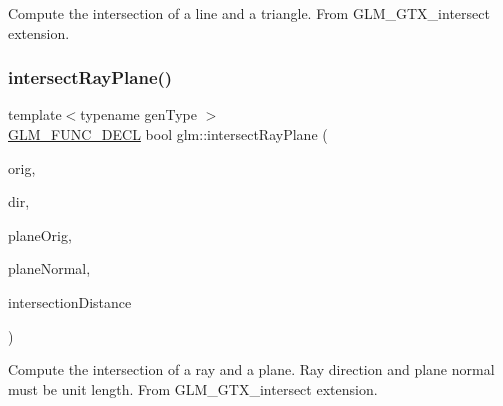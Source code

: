 Compute the intersection of a line and a triangle. From G\+L\+M\+\_\+\+G\+T\+X\+\_\+intersect extension. \mbox{\label{group__gtx__intersect_gad3697a9700ea379739a667ea02573488}} 
\subsubsection{\texorpdfstring{intersect\+Ray\+Plane()}{intersectRayPlane()}}
{\footnotesize\ttfamily template$<$typename gen\+Type $>$ \\
\mbox{\hyperlink{setup_8hpp_ab2d052de21a70539923e9bcbf6e83a51}{G\+L\+M\+\_\+\+F\+U\+N\+C\+\_\+\+D\+E\+CL}} bool glm\+::intersect\+Ray\+Plane (\begin{DoxyParamCaption}\item[{gen\+Type const \&}]{orig,  }\item[{gen\+Type const \&}]{dir,  }\item[{gen\+Type const \&}]{plane\+Orig,  }\item[{gen\+Type const \&}]{plane\+Normal,  }\item[{typename gen\+Type\+::value\+\_\+type \&}]{intersection\+Distance }\end{DoxyParamCaption})}

Compute the intersection of a ray and a plane. Ray direction and plane normal must be unit length. From G\+L\+M\+\_\+\+G\+T\+X\+\_\+intersect extension. \mbox{\label{group__gtx__intersect_gac88f8cd84c4bcb5b947d56acbbcfa56e}} 
